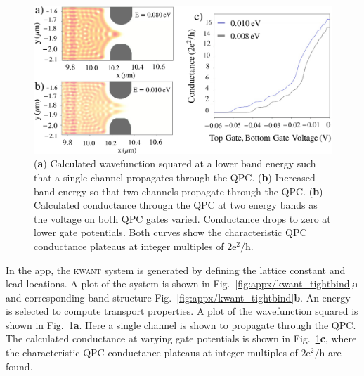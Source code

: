 \begin{figure}[!bht]
 \begin{center}
 \includegraphics[width=1.0\textwidth]{figures/appendix/appendix2_wavefunction.pdf}
 \caption[\textsc{kwant} : Transport properties]{\label{fig:appx/kwant_transport} 
 (\textbf{a}) Calculated wavefunction squared at a lower band energy such that a single channel propagates through the QPC. (\textbf{b}) Increased band energy so that two channels propagate through the QPC. (\textbf{b}) Calculated conductance through the QPC at two energy bands as the voltage on both QPC gates varied. Conductance drops to zero at lower gate potentials. Both curves show the characteristic QPC conductance plateaus at integer multiples of $\mathrm{2e^2/h}$. }
 \end{center}
\end{figure}


In the app, the \textsc{kwant} system is generated by defining the lattice constant and lead locations. A plot of the system is shown in Fig.~\ref{fig:appx/kwant_tightbind}\textbf{a} and corresponding band structure Fig.~\ref{fig:appx/kwant_tightbind}\textbf{b}. An energy is selected to compute transport properties.
A plot of the wavefunction squared is shown in Fig.~\ref{fig:appx/kwant_transport}\textbf{a}. Here a single channel is shown to propagate through the QPC. 
The calculated conductance at varying gate potentials is shown in Fig.~\ref{fig:appx/kwant_transport}\textbf{c}, where the characteristic QPC conductance plateaus at integer multiples of $\mathrm{2e^2/h}$ are found. 



